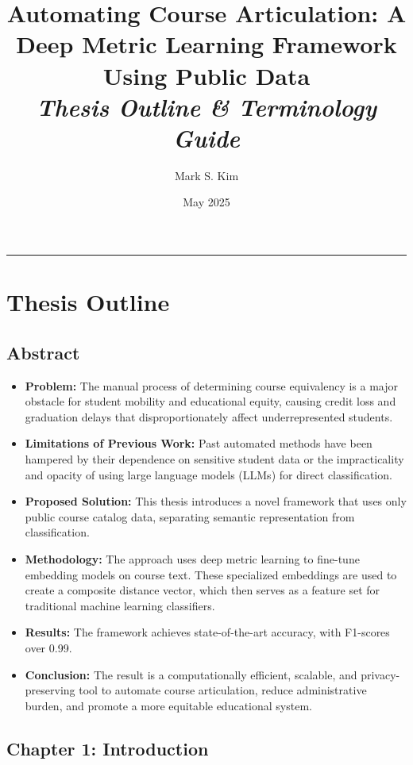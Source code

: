 \documentclass[11pt]{article}
\title{Automating Course Articulation: A Deep Metric Learning Framework Using Public Data \\ \vspace{0.5em} \large \textit{Thesis Outline \& Terminology Guide}}
\author{Mark S. Kim}
\date{May 2025}
\begin{document}
\maketitle

\hrule
\vspace{2em}

\section*{Thesis Outline}

\subsection*{Abstract}
\begin{itemize}
    \item \textbf{Problem:} The manual process of determining course equivalency is a major obstacle for student mobility and educational equity, causing credit loss and graduation delays that disproportionately affect underrepresented students.
    \item \textbf{Limitations of Previous Work:} Past automated methods have been hampered by their dependence on sensitive student data or the impracticality and opacity of using large language models (LLMs) for direct classification.
    \item \textbf{Proposed Solution:} This thesis introduces a novel framework that uses only public course catalog data, separating semantic representation from classification.
    \item \textbf{Methodology:} The approach uses deep metric learning to fine-tune embedding models on course text. These specialized embeddings are used to create a composite distance vector, which then serves as a feature set for traditional machine learning classifiers.
    \item \textbf{Results:} The framework achieves state-of-the-art accuracy, with F1-scores over 0.99.
    \item \textbf{Conclusion:} The result is a computationally efficient, scalable, and privacy-preserving tool to automate course articulation, reduce administrative burden, and promote a more equitable educational system.
\end{itemize}

\subsection*{Chapter 1: Introduction}
\end{document}
